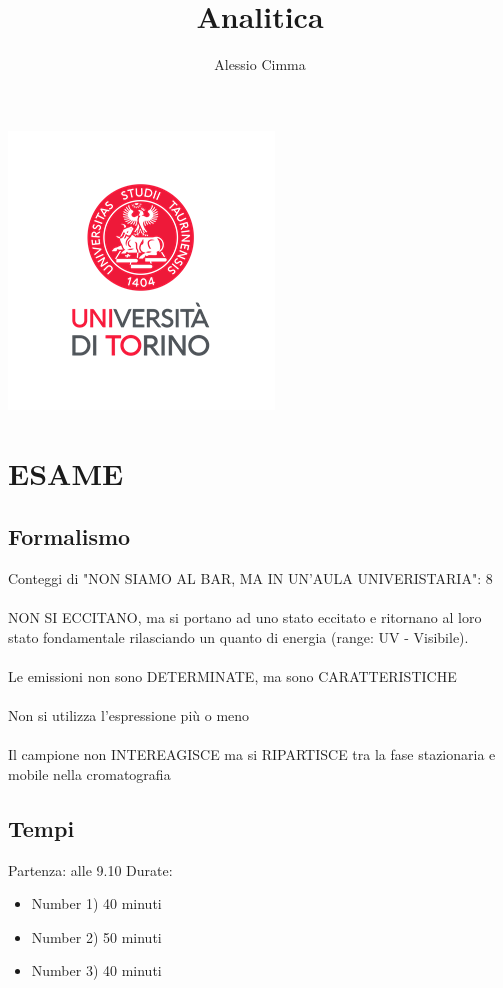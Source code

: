 \documentclass{article}
\title{Analitica}
\author{Alessio Cimma}
\begin{document}
\maketitle

\begin{center}
	\includegraphics*[width=0.22\linewidth]{../images/logo.png}
\end{center}

\tableofcontents
\newpage

\section{ESAME}
\subsection{Formalismo}
Conteggi di "NON SIAMO AL BAR, MA IN UN'AULA UNIVERISTARIA": 8
\\\\
NON SI ECCITANO, ma si portano ad uno stato eccitato e ritornano al loro stato fondamentale rilasciando un quanto di energia (range: UV - Visibile).
\\\\
Le emissioni non sono DETERMINATE, ma sono CARATTERISTICHE
\\\\
Non si utilizza l'espressione più o meno
\\\\
Il campione non INTEREAGISCE ma si RIPARTISCE tra la fase stazionaria e mobile nella cromatografia
\subsection{Tempi}
Partenza: alle 9.10
Durate:
\begin{itemize}
	\item Number 1) 40 minuti
	\item Number 2) 50 minuti
	\item Number 3) 40 minuti
\end{itemize}
\end{document}
